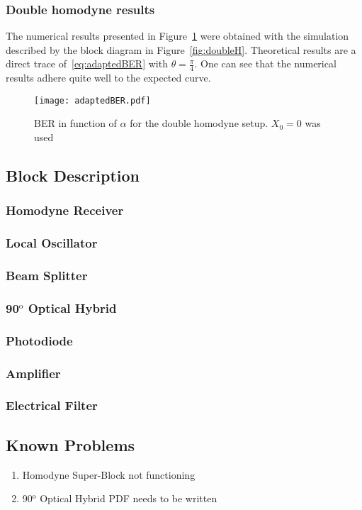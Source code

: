 \documentclass[../../sdf/tex/cv_system]{subfiles}
\begin{document}
\subsubsection{Double homodyne results}\label{subsec:DHresults}

The numerical results presented in Figure~\ref{fig:adaptedber} were obtained with the simulation described by the block diagram in Figure~\ref{fig:doubleH}. Theoretical results are a direct trace of~\eqref{eq:adaptedBER} with $\theta=\frac{\pi}{4}$. One can see that the numerical results adhere quite well to the expected curve.

\begin{figure}[h]
\centering
\texttt{[image: adaptedBER.pdf]}
\caption{BER in function of $\alpha$ for the double homodyne setup. $X_0=0$ was used}
\label{fig:adaptedber}
\end{figure}

\subsection{Block Description}

\subsubsection{Homodyne Receiver}


\subsubsection{Local Oscillator}


\subsubsection{Beam Splitter}


\subsubsection{90$^\text{o}$ Optical Hybrid}

\subsubsection{Photodiode}


\subsubsection{Amplifier}


\subsubsection{Electrical Filter}


\subsection{Known Problems}
\begin{enumerate}
    \item Homodyne Super-Block not functioning
    \item 90$^\text{o}$ Optical Hybrid PDF needs to be written
\end{enumerate}




\end{document}
